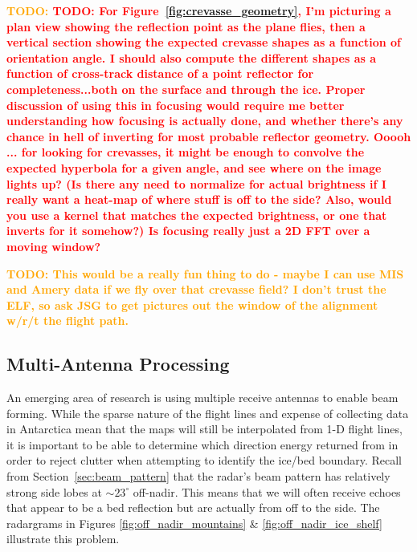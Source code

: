 \documentclass[11pt]{article}
\newcommand{\todo}[1]{\ifthenelse{\boolean{include-todos}} {\textcolor{Red}{\textbf{TODO: #1}}}{}}
\newcommand{\future}[1]{\ifthenelse{\boolean{include-future}} {\textcolor{Orange}{\textbf{TODO: #1}}}{}}
\newcommand{\secref}[1]{Section~\ref{#1}}
\newcommand{\figref}[1]{Figure~\ref{#1}}
\begin{document}
\future{\todo{For \figref{fig:crevasse_geometry}, I'm picturing a plan view showing the reflection point as the plane flies, then a vertical section showing the expected crevasse shapes as a function of orientation angle. I should also compute the different shapes as a function of cross-track distance of a point reflector for completeness...both on the surface and through the ice. Proper discussion of using this in focusing would require me better understanding how focusing is actually done, and whether there's any chance in hell of inverting for most probable reflector geometry. Ooooh ... for looking for crevasses, it might be enough to convolve the expected hyperbola for a given angle, and see where on the image lights up? (Is there any need to normalize for actual brightness if I really want a heat-map of where stuff is off to the side? Also, would you use a kernel that matches the expected brightness, or one that inverts for it somehow?) Is focusing really just a 2D FFT over a moving window?}}

\future{This would be a really fun thing to do - maybe I can use MIS and Amery data if we fly over that crevasse field? I don't trust the ELF, so ask JSG to get pictures out the window of the alignment w/r/t the flight path.}


\subsection{Multi-Antenna Processing}

An emerging area of research is using multiple receive antennas to enable beam forming.
While the sparse nature of the flight lines and expense of collecting data in Antarctica mean that the maps will still be interpolated from 1-D flight lines, it is important to be able to determine which direction energy returned from in order to reject clutter when attempting to identify the ice/bed boundary.
Recall from \secref{sec:beam_pattern} that the radar's beam pattern has relatively strong side lobes at $\sim23^\circ$ off-nadir.
This means that we will often receive echoes that appear to be a bed reflection but are actually from off to the side. 
The radargrams in Figures \ref{fig:off_nadir_mountains} \& \ref{fig:off_nadir_ice_shelf} illustrate this problem.
\end{document}

